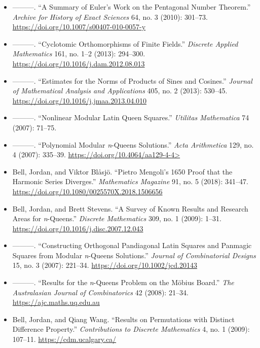 \documentclass[margin, 10pt]{res} %
\begin{document}
\begin{resume}
\begin{itemize}
\item ———. “A Summary of Euler’s Work on the Pentagonal Number Theorem.” {\em Archive for History of Exact Sciences} 64, no. 3 (2010): 301–73. \url{https://doi.org/10.1007/s00407-010-0057-y}

\item ———. “Cyclotomic Orthomorphisms of Finite Fields.” {\em Discrete Applied Mathematics} 161, no. 1–2 (2013): 294–300. \url{https://doi.org/10.1016/j.dam.2012.08.013}

\item ———. “Estimates for the Norms of Products of Sines and Cosines.” {\em Journal of Mathematical Analysis and Applications} 405, no. 2 (2013): 530–45. \url{https://doi.org/10.1016/j.jmaa.2013.04.010}

\item ———. “Nonlinear Modular Latin Queen Squares.” {\em Utilitas Mathematica} 74 (2007): 71–75.

\item ———. “Polynomial Modular {\em n}-Queens Solutions.” {\em Acta Arithmetica} 129, no. 4 (2007): 335–39. \url{https://doi.org/10.4064/aa129-4-4>}

\item Bell, Jordan, and Viktor Blåsjö. “Pietro Mengoli’s 1650 Proof that the Harmonic Series Diverges.” {\em Mathematics Magazine} 91, no. 5 (2018): 341–47. \url{https://doi.org/10.1080/0025570X.2018.1506656}

\item Bell, Jordan, and Brett Stevens. “A Survey of Known Results and Research Areas for {\em n}-Queens.” {\em Discrete Mathematics} 309, no. 1 (2009): 1–31. \url{https://doi.org/10.1016/j.disc.2007.12.043}

\item ———. “Constructing Orthogonal Pandiagonal Latin Squares and Panmagic Squares from Modular {\em n}-Queens Solutions.” {\em Journal of Combinatorial Designs} 15, no. 3 (2007): 221–34. \url{https://doi.org/10.1002/jcd.20143}

\item ———. “Results for the {\em n}-Queens Problem on the Möbius Board.” {\em The Australasian Journal of Combinatorics} 42 (2008): 21–34. \url{https://ajc.maths.uq.edu.au}

\item Bell, Jordan, and Qiang Wang. “Results on Permutations with Distinct Difference Property.” {\em Contributions to Discrete Mathematics} 4, no. 1 (2009): 107–11. \url{https://cdm.ucalgary.ca/}
\end{itemize}


\end{resume}
\end{document}
